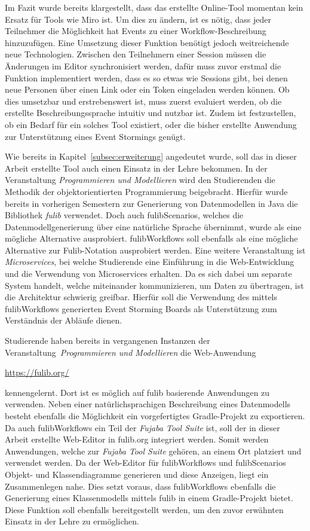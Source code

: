 Im Fazit wurde bereits klargestellt, dass das erstellte Online-Tool momentan kein Ersatz für Tools wie Miro ist.
Um dies zu ändern, ist es nötig, dass jeder Teilnehmer die Möglichkeit hat Events zu einer Workflow-Beschreibung hinzuzufügen.
Eine Umsetzung dieser Funktion benötigt jedoch weitreichende neue Technologien.
Zwischen den Teilnehmern einer Session müssen die Änderungen im Editor synchronisiert werden, dafür muss zuvor erstmal die Funktion
implementiert werden, dass es so etwas wie Sessions gibt, bei denen neue Personen über einen Link oder ein Token eingeladen werden können.
Ob dies umsetzbar und erstrebenswert ist, muss zuerst evaluiert werden, ob die erstellte Beschreibungssprache intuitiv und nutzbar ist.
Zudem ist festzustellen, ob ein Bedarf für ein solches Tool existiert, oder die bisher erstellte Anwendung zur Unterstützung eines Event Stormings genügt.

Wie bereits in Kapitel~\ref{subsec:erweiterung} angedeutet wurde, soll das in dieser Arbeit erstellte Tool auch einen Einsatz in der Lehre bekommen.
In der Veranstaltung \textit{Programmieren und Modellieren} wird den Studierenden die Methodik der objektorientierten Programmierung beigebracht.
Hierfür wurde bereits in vorherigen Semestern zur Generierung von Datenmodellen in Java die Bibliothek \textit{fulib} verwendet.
Doch auch fulibScenarios, welches die Datenmodellgenerierung über eine natürliche Sprache übernimmt, wurde als eine mögliche Alternative ausprobiert.
fulibWorkflows soll ebenfalls als eine mögliche Alternative zur Fulib-Notation ausprobiert werden.
Eine weitere Veranstaltung ist \textit{Microservices}, bei welche Studierende eine Einführung in die Web-Entwicklung und die Verwendung von
Microservices erhalten.
Da es sich dabei um separate System handelt, welche miteinander kommunizieren, um Daten zu übertragen, ist die Architektur schwierig greifbar.
Hierfür soll die Verwendung des mittels fulibWorkflows generierten Event Storming Boards als Unterstützung zum Verständnis der Abläufe dienen.

Studierende haben bereits in vergangenen Instanzen der Veranstaltung~\textit{Programmieren und Modellieren} die Web-Anwendung

\-\hspace{5cm}\url{https://fulib.org/}

kennengelernt.
Dort ist es möglich auf fulib basierende Anwendungen zu verwenden.
Neben einer natürlichsprachigen Beschreibung eines Datenmodells besteht ebenfalls die Möglichkeit ein vorgefertigtes Gradle-Projekt zu exportieren.
Da auch fulibWorkflows ein Teil der \textit{Fujaba Tool Suite} ist, soll der in dieser Arbeit erstellte Web-Editor in fulib.org integriert werden.
Somit werden Anwendungen, welche zur \textit{Fujaba Tool Suite} gehören, an einem Ort platziert und verwendet werden.
Da der Web-Editor für fulibWorkflows und fulibScenarios Objekt- und Klassendiagramme generieren und diese Anzeigen, liegt ein Zusammenlegen nahe.
Dies setzt voraus, dass fulibWorkflows ebenfalls die Generierung eines Klassenmodells mittels fulib in einem Gradle-Projekt bietet.
Diese Funktion soll ebenfalls bereitgestellt werden, um den zuvor erwähnten Einsatz in der Lehre zu ermöglichen.
